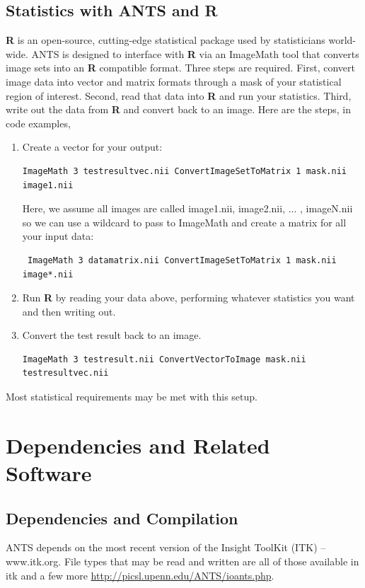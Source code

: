 \documentclass{InsightArticle}
\begin{document}
\subsection{Statistics with ANTS and {\bf R}}
{\bf R} is an open-source, cutting-edge statistical package 
used by statisticians world-wide.   ANTS is designed to 
interface with {\bf R} via an ImageMath tool that converts 
image sets into an {\bf R} compatible format.  
Three steps are required.  First, convert image data into 
vector and matrix formats through a mask of your statistical 
region of interest.  Second, read that data into {\bf R} and 
run your statistics.  Third, write out the data from {\bf R} and 
convert back to an image.  Here are the steps, in code examples,
\begin{enumerate}
\item Create a vector for your output: 
\begin{verbatim} 
ImageMath 3 testresultvec.nii ConvertImageSetToMatrix 1 mask.nii image1.nii
\end{verbatim}
Here, we assume all images are called image1.nii, image2.nii, ... , imageN.nii so we 
can use a wildcard to pass to ImageMath and 
create a matrix for all your input data: 
\begin{verbatim} 
 ImageMath 3 datamatrix.nii ConvertImageSetToMatrix 1 mask.nii image*.nii 
\end{verbatim}
\item   Run {\bf R} by reading your data above, performing whatever statistics you want and then 
writing out.  
\item   Convert the test result back to an image.  
\begin{verbatim} 
ImageMath 3 testresult.nii ConvertVectorToImage mask.nii testresultvec.nii
\end{verbatim}
\end{enumerate}
Most statistical requirements may be met with this setup. 
\section{Dependencies and Related Software}
\subsection{Dependencies and Compilation}
ANTS depends on the most recent version of the Insight ToolKit (ITK)
-- www.itk.org.   File types that may be read and written are 
all of those available in itk and a few more \href{http://picsl.upenn.edu/ANTS/ioants.php}{http://picsl.upenn.edu/ANTS/ioants.php}.
\end{document}
